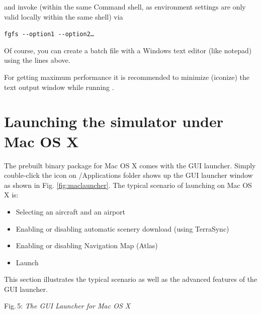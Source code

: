 \noindent
 and invoke \FlightGear{} (within the same Command shell, as environment
 settings are only valid locally within the same shell) via
\medskip

\texttt{fgfs -$ $-option1 -$ $-option2\dots}
\medskip

Of course, you can create a batch file with a Windows text editor (like notepad)
using the lines above.

For getting maximum performance it is recommended to minimize (iconize) the
text output window while running \FlightGear{}.

\section{Launching the simulator under Mac OS X}
The prebuilt binary package for Mac OS X comes with the GUI launcher. Simply couble-click the \FlightGear{} icon on /Applications folder shows up the GUI launcher window as shown in Fig. \ref{fig:maclauncher}. The typical scenario of launching \FlightGear{} on Mac OS X is:

\begin{itemize}
\item Selecting an aircraft and an airport
\item Enabling or disabling automatic scenery download (using TerraSync)
\item Enabling or disabling Navigation Map (Atlas)
\item Launch \FlightGear{}
\end{itemize}

This section illustrates the typical scenario as well as the advanced features of the GUI launcher.

\smallskip

 \centerline{}
\smallskip
\noindent
Fig.\,5: \textit{The GUI Launcher for Mac OS X} \label{fig:maclauncher}

